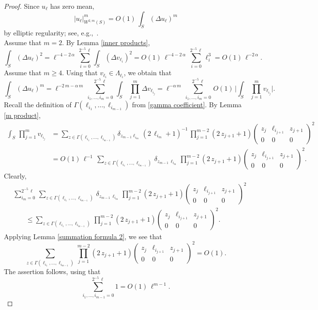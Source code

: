 \documentclass[11pt]{amsart}
\theoremstyle {definition}
\begin{document}
\begin{proof}
	Since $u_\ell$ has zero mean,  
	$$
	|u_\ell|^m_{W^{2,m}(S)}=O(1)\,\int_{S}(\Delta u_\ell)^m
	$$
by elliptic regularity;	see, e.g.,~\cite[Theorem 9.11]{GilbargTrudinger}.\\
\indent Assume that $m=2$. By Lemma \ref{inner products}, 
$$
\int_S (\Delta u_\ell)^2= \ell^{-4-2\,\alpha}\,\sum_{i=0}^{2^{-5}\,\ell} \int_S (\Delta v_{\ell_i})^2 =O(1)\,\ell^{-4-2\,\alpha}\,\sum_{i=0}^{2^{-5}\,\ell}\ell_i^3=O(1)\,\ell^{-2\,\alpha}. 
$$
\indent Assume that $m\geq 4$. 	Using that $v_{\ell_i}\in \Lambda_{\ell_i}$, we obtain that 
	$$
	\int_S (\Delta u_\ell)^m=\ell^{-2\,m-\alpha\,m}\,\sum_{i_1,\ldots, i_m=0}^{2^{-5}\,\ell}\,\int_S\,\prod_{j=1}^m \Delta v_{\ell_{i_j}}=\ell^{-\alpha\,m}\,\sum_{i_1,\ldots,i_m=0}^{2^{-5}\,\ell}\,O(1)\,\bigg|\int_S\,\prod_{j=1}^m v_{\ell_{i_j}}\bigg|.
	$$ 
Recall  the definition of $\Gamma(\ell_{i_1},\ldots, \ell_{i_{m-1}})$ from \eqref{gamma coefficient}. 	By Lemma \ref{m product},
	\begin{align*}
		\int_S\,\prod_{j=1}^m v_{\ell_{i_j}}&=\sum_{ z\in\Gamma(\ell_{i_1},\ldots, \ell_{i_{m-1}})} \delta_{z_{{m-1}}\ell_{i_m}} \,(2\,\ell_{i_m}+1)^{-1}
		\,\prod_{j=1}^{m-2}(2\,z_{j+1}+1)\begin{pmatrix} z_{{j}} & \ell_{i_{j+1}} & z_{j+1} \\
			0 & 0 &0 \end{pmatrix}^2
		\\&=O(1)\,\ell^{-1}\,\sum_{ z\in\Gamma(\ell_{i_1},\ldots, \ell_{i_{m-1}})} \,\delta_{z_{{m-1}}\,\ell_{i_m}}
		\,\prod_{j=1}^{m-2}(2\,z_{j+1}+1)\begin{pmatrix} z_{{j}} & \ell_{i_{j+1}} & z_{j+1}  \\
			0 & 0 &0 \end{pmatrix}^2.
	\end{align*} 
Clearly,
	\begin{align*}
		&\,\sum_{i_m=0}^{2^{-5}\,\ell}\,\sum_{ z\in\Gamma(\ell_{i_1},\ldots, \ell_{i_{m-1}})} \,\delta_{z_{{m-1}}\,\ell_{i_m}}
		\,\prod_{j=1}^{m-2}(2\,z_{j+1}+1)\begin{pmatrix} z_{{j}} & \ell_{i_{j+1}} & z_{j+1}  \\
			0 & 0 &0 \end{pmatrix}^2		
		\\&\qquad\leq \sum_{ z\in\Gamma(\ell_{i_1},\ldots, \ell_{i_{m-1}})} 
		\,\prod_{j=1}^{m-2}(2\,z_{j+1}+1)\begin{pmatrix} z_{{j}} & \ell_{i_{j+1}} & z_{j+1} \\
			0 & 0 &0 \end{pmatrix}^2.
	\end{align*} 
	Applying Lemma \ref{summation formula 2}, we see that 
	$$
	\sum_{z\in\Gamma(\ell_{i_1},\ldots, \ell_{i_{m-1}})} 
	\,\prod_{j=1}^{m-2}(2\,z_{j+1}+1)\begin{pmatrix} z_{{j}} & \ell_{i_{j+1}} & z_{j+1} \\
		0 & 0 &0 \end{pmatrix}^2=O(1).
	$$
	The assertion follows, using that 
	$$
	\sum_{i_1,\ldots,i_{m-1}=0}^{2^{-5}\,\ell}1=O(1)\,\ell^{m-1}.
	$$
\end{proof} 
\end{document}

